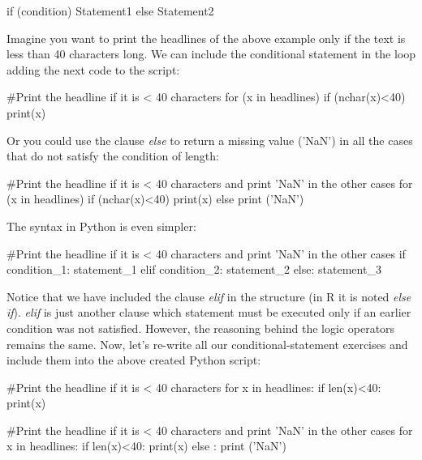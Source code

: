 \begin{exampler}
if (condition) {
    Statement1
} else {
    Statement2
}
\end{exampler}

Imagine you want to print the headlines of the above example only if the text is less than 40 characters long. We can include the conditional statement in the loop adding the next code to the script:

\begin{exampler}
#Print the headline if it is < 40 characters
for (x in headlines){
  if (nchar(x)<40) {
    print(x)}
  }
\end{exampler}

Or you could use the clause \emph{else} to return a missing value ('NaN') in all the cases that do not satisfy the condition of length:

\begin{exampler}
#Print the headline if it is < 40 characters and print 'NaN' in the other cases
for (x in headlines){
  if (nchar(x)<40) {
    print(x)}
  else 
    print ('NaN')}
\end{exampler}

The syntax in Python is even simpler:

\begin{examplepy}
#Print the headline if it is < 40 characters and print 'NaN' in the other cases
if condition_1:
    statement_1
elif condition_2:
    statement_2
else:
    statement_3
\end{examplepy}

Notice that we have included the clause \emph{elif} in the structure (in R it is noted \emph{else if}). \emph{elif} is just another clause which statement must be executed only if an earlier condition was not satisfied. However, the reasoning behind the logic operators remains the same. Now, let's re-write all our conditional-statement exercises and include them into the above created Python script:

\begin{examplepy}
#Print the headline if it is < 40 characters
for x in headlines:
  if len(x)<40:
    print(x)

#Print the headline if it is < 40 characters and print 'NaN' in the other cases
for x in headlines:
  if len(x)<40:
    print(x)
  else :
    print ('NaN')
\end{examplepy}

